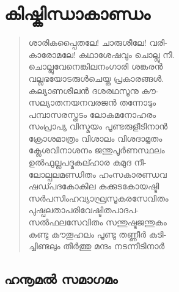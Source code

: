 

\chapter{കിഷ്കിന്ധാകാണ്ഡം}

\begin{verse}
ശാരികപ്പൈതലേ! ചാരുശീലേ! വരി-\\
കാരോമലേ! കഥാശേഷവും ചൊല്ലു നീ.\\
ചൊല്ലുവേനെങ്കിലനംഗാരി ശങ്കരന്‍\\
വല്ലഭയോടരുള്‍ചെയ്ത പ്രകാരങ്ങള്‍.\\
കല്യാണശീലന്‍ ദശരഥസൂനു കൗ-\\
സല്യാതനയനവരജന്‍ തന്നോടും\\
പമ്പാസരസ്തടം ലോകമനോഹരം\\
സംപ്രാപ്യ വിസ്മയം പൂണ്ടരുളീടിനാന്‍\\
ക്രോശമാത്രം വിശാലം വിശദാമൃതം\\
ക്ലേശവിനാശനം ജന്തുപൂര്‍ണസ്ഥലം\\
ഉല്‍ഫുല്ലപദ്മകല്ഹാര കുമുദ നീ-\\
ലോല്പലമണ്ഡിതം ഹംസകാരണ്ഡവ\\
ഷഡ്പദകോകില കുക്കുടകോയഷ്ടി\\
സര്‍പസിംഹവ്യാഘ്രസൂകരസേവിതം\\
പുഷ്പലതാപരിവേഷ്ടിതപാദപ-\\
സല്‍ഫലസേവിതം സന്തുഷ്ടജന്തുകം\\
കണ്ടു കൗതൂഹലം പൂണ്ടു തണ്ണീര്‍ കുടി-\\
ച്ചിണ്ടലും തീര്‍ത്തു മന്ദം നടന്നീടിനാര്‍
\end{verse}


\section{ഹനൂമല്‍ സമാഗമം}

